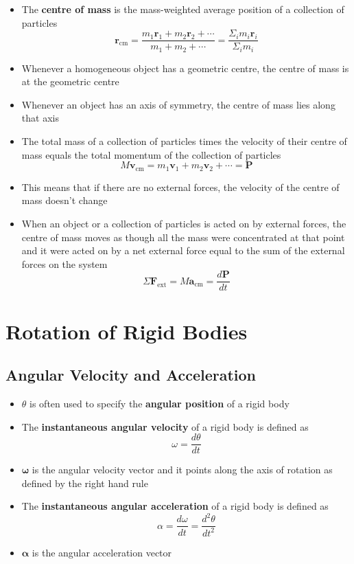 \documentclass{article}
\begin{document}
\begin{itemize}
    \item The \textbf{centre of mass} is the mass-weighted average position of a collection of particles \[\mathbf{r}_\textrm{cm}=\frac{m_1\mathbf{r}_1+m_2\mathbf{r}_2+\cdots}{m_1+m_2+\cdots}=\frac{\Sigma_i m_i\mathbf{r}_i}{\Sigma_i m_i}\]

    \item Whenever a homogeneous object has a geometric centre, the centre of mass is at the geometric centre

    \item Whenever an object has an axis of symmetry, the centre of mass lies along that axis

    \item The total mass of a collection of particles times the velocity of their centre of mass equals the total momentum of the collection of particles \[M\mathbf{v}_\textrm{cm}=m_1\mathbf{v}_1+m_2\mathbf{v}_2+\cdots=\mathbf{P}\]

    \item This means that if there are no external forces, the velocity of the centre of mass doesn't change

    \item When an object or a collection of particles is acted on by external forces, the centre of mass moves as though all the mass were concentrated at that point and it were acted on by a net external force equal to the sum of the external forces on the system \[\Sigma\mathbf{F}_\textrm{ext}=M\mathbf{a}_\textrm{cm}=\frac{d\mathbf{P}}{dt}\]
\end{itemize}

\section{Rotation of Rigid Bodies}

\subsection{Angular Velocity and Acceleration}

\begin{itemize}
    \item $\theta$ is often used to specify the \textbf{angular position} of a rigid body

    \item The \textbf{instantaneous angular velocity} of a rigid body is defined as \[\omega=\frac{d\theta}{dt}\]

    \item $\bm\omega$ is the angular velocity vector and it points along the axis of rotation as defined by the right hand rule

    \item The \textbf{instantaneous angular acceleration} of a rigid body is defined as \[\alpha=\frac{d\omega}{dt}=\frac{d^2\theta}{dt^2}\]

    \item $\bm\alpha$ is the angular acceleration vector
\end{itemize}
\end{document}
